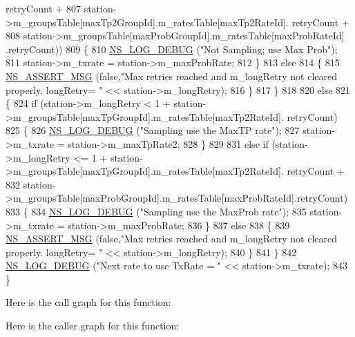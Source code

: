 \begin{DoxyCode}
      retryCount +
807                                          station->m\_groupsTable[maxTp2GroupId].m\_ratesTable[maxTp2RateId].
      retryCount +
808                                          station->m\_groupsTable[maxProbGroupId].m\_ratesTable[maxProbRateId]
      .retryCount))
809         \{
810           \hyperlink{group__logging_ga413f1886406d49f59a6a0a89b77b4d0a}{NS\_LOG\_DEBUG} (\textcolor{stringliteral}{"Not Sampling; use Max Prob"});
811           station->m\_txrate = station->m\_maxProbRate;
812         \}
813       \textcolor{keywordflow}{else}
814         \{
815           \hyperlink{assert_8h_aff5ece9066c74e681e74999856f08539}{NS\_ASSERT\_MSG} (\textcolor{keyword}{false},\textcolor{stringliteral}{"Max retries reached and m\_longRetry not cleared properly.
       longRetry= "} << station->m\_longRetry);
816         \}
817     \}
818 
820   \textcolor{keywordflow}{else}
821     \{
824       \textcolor{keywordflow}{if} (station->m\_longRetry < 1 + station->m\_groupsTable[maxTpGroupId].m\_ratesTable[maxTp2RateId].
      retryCount)
825         \{
826           \hyperlink{group__logging_ga413f1886406d49f59a6a0a89b77b4d0a}{NS\_LOG\_DEBUG} (\textcolor{stringliteral}{"Sampling use the MaxTP rate"});
827           station->m\_txrate = station->m\_maxTpRate2;
828         \}
829 
831       \textcolor{keywordflow}{else} \textcolor{keywordflow}{if} (station->m\_longRetry <= 1 + station->m\_groupsTable[maxTpGroupId].m\_ratesTable[maxTp2RateId].
      retryCount +
832                station->m\_groupsTable[maxProbGroupId].m\_ratesTable[maxProbRateId].retryCount)
833         \{
834           \hyperlink{group__logging_ga413f1886406d49f59a6a0a89b77b4d0a}{NS\_LOG\_DEBUG} (\textcolor{stringliteral}{"Sampling use the MaxProb rate"});
835           station->m\_txrate = station->m\_maxProbRate;
836         \}
837       \textcolor{keywordflow}{else}
838         \{
839           \hyperlink{assert_8h_aff5ece9066c74e681e74999856f08539}{NS\_ASSERT\_MSG} (\textcolor{keyword}{false},\textcolor{stringliteral}{"Max retries reached and m\_longRetry not cleared properly.
       longRetry= "} << station->m\_longRetry);
840         \}
841     \}
842   \hyperlink{group__logging_ga413f1886406d49f59a6a0a89b77b4d0a}{NS\_LOG\_DEBUG} (\textcolor{stringliteral}{"Next rate to use TxRate = "} << station->m\_txrate);
843 \}
\end{DoxyCode}


Here is the call graph for this function\+:




Here is the caller graph for this function\+:


